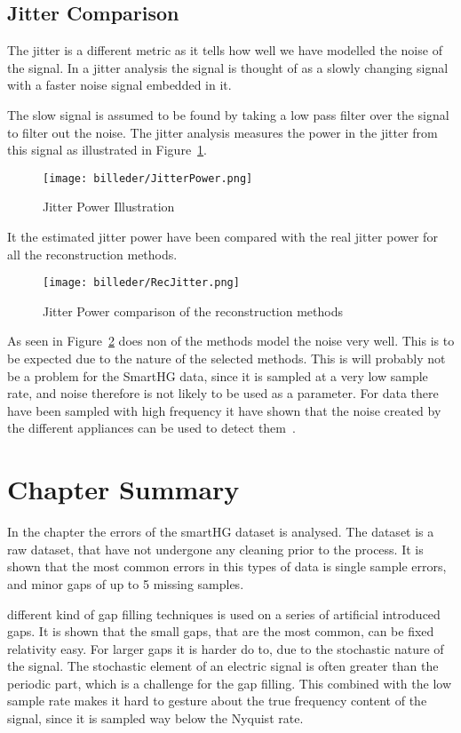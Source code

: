 \subsection{Jitter Comparison }
\label{T:jitterCom}

The jitter is a different metric as it tells how well we have modelled the noise of the signal. In a jitter analysis the signal is thought of as a slowly changing signal with a faster noise signal embedded in it.

The slow signal is assumed to be found by taking a low pass filter over the signal to filter out the noise. The jitter analysis measures the power in the jitter from this signal as illustrated in Figure~\ref{fig:JitPow}. 

\begin{figure}[H]
\centering
\texttt{[image: billeder/JitterPower.png]}
\caption{Jitter Power Illustration}
\label{fig:JitPow}
\end{figure}

It the estimated jitter power have been compared with the real jitter power for all the reconstruction methods. 

\begin{figure}[H]
\centering
\texttt{[image: billeder/RecJitter.png]}
\caption{Jitter Power comparison of the reconstruction methods}
\label{fig:RecJit}
\end{figure}

As seen in Figure~\ref{fig:RecJit} does non of the methods model the noise very well. This is to be expected due to the nature of the selected methods. This is will probably not be a problem for the SmartHG data, since it is sampled at a very low sample rate, and noise therefore is not likely to be used as a parameter. For data there have been sampled with high frequency it have shown that the noise created by the different appliances can be used to detect them~\citep{RefWorks:17}. 

\section{Chapter Summary}
In the chapter the errors of the smartHG dataset is analysed. The dataset is a raw dataset, that have not undergone any cleaning prior to the process. It is shown that the most common errors in this types of data is single sample errors, and minor gaps of up to 5 missing samples.  

different kind of gap filling techniques is used on a series of artificial introduced gaps. It is shown that the small gaps, that are the most common, can be fixed relativity easy. For larger gaps it is harder do to, due to the stochastic nature of the signal. The stochastic element of an electric signal is often greater than the periodic part, which is a challenge for the gap filling. This combined with the low sample rate makes it hard to gesture about the true frequency content of the signal, since it is sampled way below the Nyquist rate.  
